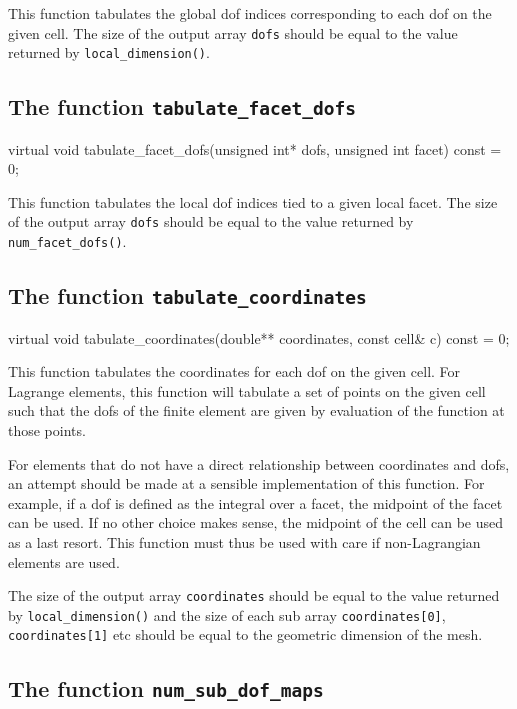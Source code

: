 This function tabulates the global dof indices corresponding to each
dof on the given cell. The size of the output array \texttt{dofs}
should be equal to the value returned by \texttt{local\_dimension()}.

\subsection{The function \texttt{tabulate\_facet\_dofs}}

\begin{code}
virtual void
tabulate_facet_dofs(unsigned int* dofs,
                    unsigned int facet) const = 0;
\end{code}

This function tabulates the local dof indices tied to a given local
facet. The size of the output array \texttt{dofs} should be equal to
the value returned by \texttt{num\_facet\_dofs()}.

\subsection{The function \texttt{tabulate\_coordinates}}

\begin{code}
virtual void tabulate_coordinates(double** coordinates,
                                  const cell& c) const = 0;
\end{code}

This function tabulates the coordinates for each dof on the given
cell. For Lagrange elements, this function will tabulate a set of
points on the given cell such that the dofs of the finite element are
given by evaluation of the function at those points.

For elements that do not have a direct relationship between
coordinates and dofs, an attempt should be made at a sensible
implementation of this function. For example, if a dof is defined as
the integral over a facet, the midpoint of the facet can be used. If
no other choice makes sense, the midpoint of the cell can be used as a
last resort. This function must thus be used with care if
non-Lagrangian elements are used.

The size of the output array \texttt{coordinates} should be equal to
the value returned by \texttt{local\_dimension()} and the size of each
sub array \texttt{coordi\-nates[0]}, \texttt{coordinates[1]} etc should
be equal to the geometric dimension of the mesh.

\subsection{The function \texttt{num\_sub\_dof\_maps}}

